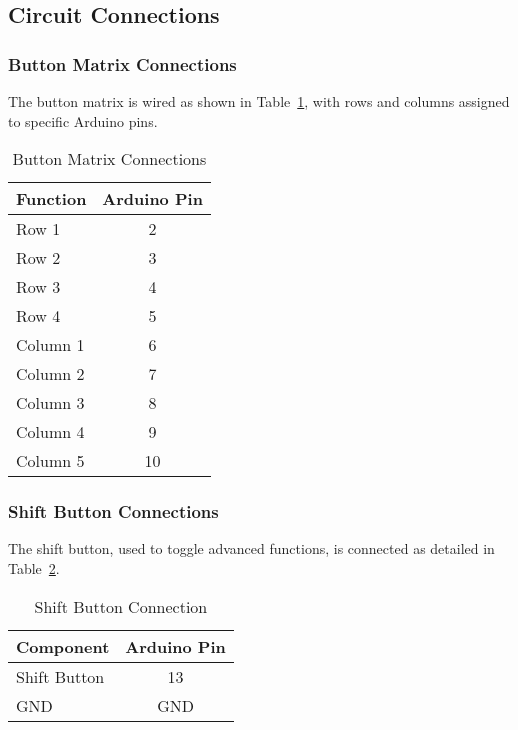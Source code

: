 \documentclass[a4paper,12pt]{article}
\begin{document}
\subsection{Circuit Connections}

\subsubsection{Button Matrix Connections}
The button matrix is wired as shown in Table~\ref{tab:matrix}, with rows and columns assigned to specific Arduino pins.

\begin{table}[H]
    \centering
    \renewcommand{\arraystretch}{1.2}
    \begin{tabular}{|l|c|}
        \hline
        \textbf{Function} & \textbf{Arduino Pin} \\
        \hline
        Row 1 & 2 \\
        Row 2 & 3 \\
        Row 3 & 4 \\
        Row 4 & 5 \\
        Column 1 & 6 \\
        Column 2 & 7 \\
        Column 3 & 8 \\
        Column 4 & 9 \\
        Column 5 & 10 \\
        \hline
    \end{tabular}
    \caption{Button Matrix Connections}
    \label{tab:matrix}
\end{table}

\subsubsection{Shift Button Connections}
The shift button, used to toggle advanced functions, is connected as detailed in Table~\ref{tab:shift}.

\begin{table}[H]
    \centering
    \renewcommand{\arraystretch}{1.2}
    \begin{tabular}{|l|c|}
        \hline
        \textbf{Component} & \textbf{Arduino Pin} \\
        \hline
        Shift Button & 13 \\
        GND & GND \\
        \hline
    \end{tabular}
    \caption{Shift Button Connection}
    \label{tab:shift}
\end{table}
\end{document}
